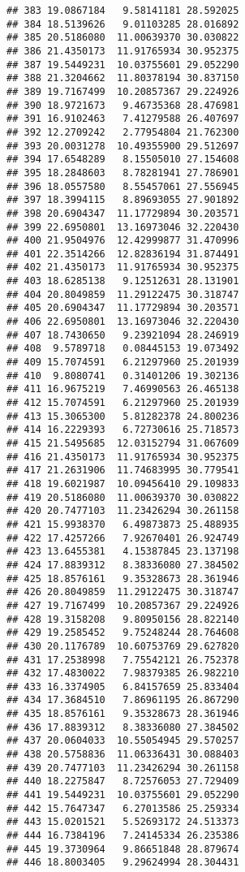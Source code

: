 \documentclass[]{article}
\begin{document}
\begin{verbatim}
## 383 19.0867184   9.58141181 28.592025
## 384 18.5139626   9.01103285 28.016892
## 385 20.5186080  11.00639370 30.030822
## 386 21.4350173  11.91765934 30.952375
## 387 19.5449231  10.03755601 29.052290
## 388 21.3204662  11.80378194 30.837150
## 389 19.7167499  10.20857367 29.224926
## 390 18.9721673   9.46735368 28.476981
## 391 16.9102463   7.41279588 26.407697
## 392 12.2709242   2.77954804 21.762300
## 393 20.0031278  10.49355900 29.512697
## 394 17.6548289   8.15505010 27.154608
## 395 18.2848603   8.78281941 27.786901
## 396 18.0557580   8.55457061 27.556945
## 397 18.3994115   8.89693055 27.901892
## 398 20.6904347  11.17729894 30.203571
## 399 22.6950801  13.16973046 32.220430
## 400 21.9504976  12.42999877 31.470996
## 401 22.3514266  12.82836194 31.874491
## 402 21.4350173  11.91765934 30.952375
## 403 18.6285138   9.12512631 28.131901
## 404 20.8049859  11.29122475 30.318747
## 405 20.6904347  11.17729894 30.203571
## 406 22.6950801  13.16973046 32.220430
## 407 18.7430650   9.23921094 28.246919
## 408  9.5789718   0.08445153 19.073492
## 409 15.7074591   6.21297960 25.201939
## 410  9.8080741   0.31401206 19.302136
## 411 16.9675219   7.46990563 26.465138
## 412 15.7074591   6.21297960 25.201939
## 413 15.3065300   5.81282378 24.800236
## 414 16.2229393   6.72730616 25.718573
## 415 21.5495685  12.03152794 31.067609
## 416 21.4350173  11.91765934 30.952375
## 417 21.2631906  11.74683995 30.779541
## 418 19.6021987  10.09456410 29.109833
## 419 20.5186080  11.00639370 30.030822
## 420 20.7477103  11.23426294 30.261158
## 421 15.9938370   6.49873873 25.488935
## 422 17.4257266   7.92670401 26.924749
## 423 13.6455381   4.15387845 23.137198
## 424 17.8839312   8.38336080 27.384502
## 425 18.8576161   9.35328673 28.361946
## 426 20.8049859  11.29122475 30.318747
## 427 19.7167499  10.20857367 29.224926
## 428 19.3158208   9.80950156 28.822140
## 429 19.2585452   9.75248244 28.764608
## 430 20.1176789  10.60753769 29.627820
## 431 17.2538998   7.75542121 26.752378
## 432 17.4830022   7.98379385 26.982210
## 433 16.3374905   6.84157659 25.833404
## 434 17.3684510   7.86961195 26.867290
## 435 18.8576161   9.35328673 28.361946
## 436 17.8839312   8.38336080 27.384502
## 437 20.0604033  10.55054945 29.570257
## 438 20.5758836  11.06336431 30.088403
## 439 20.7477103  11.23426294 30.261158
## 440 18.2275847   8.72576053 27.729409
## 441 19.5449231  10.03755601 29.052290
## 442 15.7647347   6.27013586 25.259334
## 443 15.0201521   5.52693172 24.513373
## 444 16.7384196   7.24145334 26.235386
## 445 19.3730964   9.86651848 28.879674
## 446 18.8003405   9.29624994 28.304431

\end{verbatim}
\end{document}
